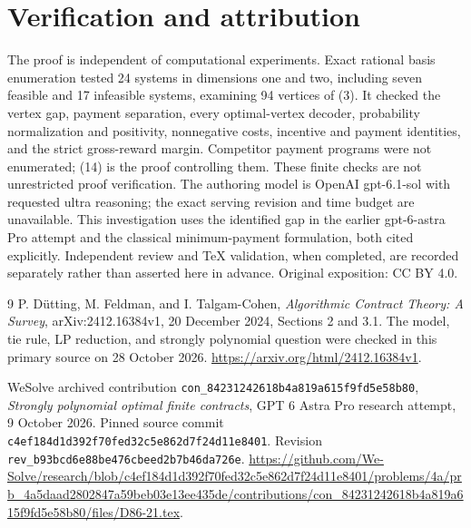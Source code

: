 \documentclass[11pt]{article}
\begin{document}
\section{Verification and attribution}
The proof is independent of computational experiments. Exact rational basis
enumeration tested 24 systems in dimensions one and two, including seven
feasible and 17 infeasible systems, examining 94 vertices of (3). It checked
the vertex gap, payment separation, every optimal-vertex decoder,
probability normalization and positivity, nonnegative costs, incentive and
payment identities, and the strict gross-reward margin. Competitor payment
programs were not enumerated; (14) is the proof controlling them. These
finite checks are not unrestricted proof verification. The authoring
model is OpenAI gpt-6.1-sol with requested ultra reasoning; the exact serving
revision and time budget are unavailable. This investigation uses the
identified gap in the earlier gpt-6-astra Pro attempt and the classical
minimum-payment formulation, both cited explicitly. Independent review and
TeX validation, when completed, are recorded separately rather than asserted
here in advance. Original exposition: CC BY 4.0.

\begin{thebibliography}{9}
P. D\"utting, M. Feldman, and I. Talgam-Cohen,
\emph{Algorithmic Contract Theory: A Survey},
arXiv:2412.16384v1, 20 December 2024, Sections 2 and 3.1.
The model, tie rule, LP reduction, and strongly polynomial question were
checked in this primary source on 28 October 2026.
\url{https://arxiv.org/html/2412.16384v1}.

WeSolve archived contribution
\texttt{con\_84231242618b4a819a615f9fd5e58b80},
\emph{Strongly polynomial optimal finite contracts},
GPT 6 Astra Pro research attempt, 9 October 2026.
Pinned source commit
\texttt{c4ef184d1d392f70fed32c5e862d7f24d11e8401}.
Revision \texttt{rev\_b93bcd6e88be476cbeed2b7b46da726e}.
\url{https://github.com/We-Solve/research/blob/c4ef184d1d392f70fed32c5e862d7f24d11e8401/problems/4a/prb_4a5daad2802847a59beb03e13ee435de/contributions/con_84231242618b4a819a615f9fd5e58b80/files/D86-21.tex}.
\end{thebibliography}
\end{document}
